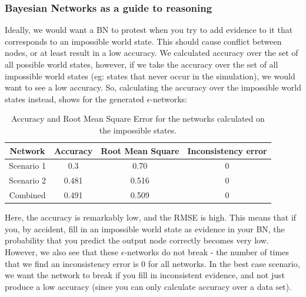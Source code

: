  \subsubsection{Bayesian Networks as a guide to reasoning}
 Ideally, we would want a BN to protest when you try to add evidence to it that corresponds to an impossible world state. This should cause conflict between nodes, or at least result in a low accuracy. We calculated accuracy over the set of all possible world states, however, if we take the accuracy over the set of all impossible world states (eg: states that never occur in the simulation), we would want to see a low accuracy. So, calculating the accuracy over the impossible world states instead, shows for the generated $\epsilon$-networks:
 \begin{table}[htp]
\begin{center}
\begin{tabular}{|c|c|c|c|}
 \hline
 Network & Accuracy & Root Mean Square & Inconsistency error\\
 \hline
 Scenario 1   & 0.3 &  0.70 & 0   \\
 Scenario 2 & 0.481 & 0.516 & 0\\
 Combined & 0.491 & 0.509& 0\\
\hline
\end{tabular}
\caption{Accuracy and Root Mean Square Error for the networks calculated on the impossible states.}
\end{center}
\label{tabB}
\end{table}

Here, the accuracy is remarkably low, and the RMSE is high. This means that if you, by accident, fill in an impossible world state as evidence in your BN, the probability that you predict the output node correctly becomes very low. However, we also see that these $\epsilon$-networks do not break - the number of times that we find an inconsistency error is 0 for all networks. In the best case scenario, we want the network to break if you fill in inconsistent evidence, and not just produce a low accuracy (since you can only calculate accuracy over a data set). 


